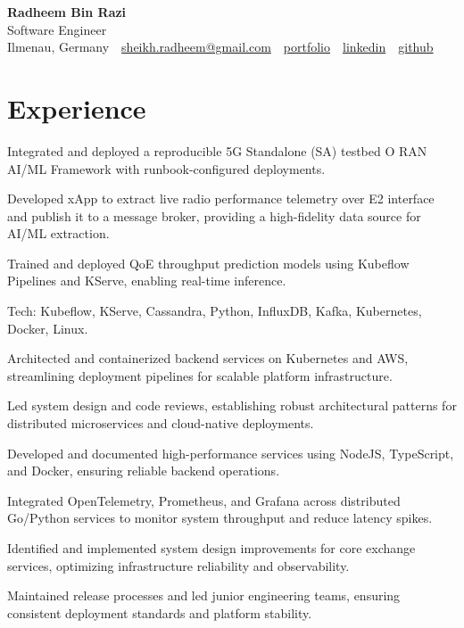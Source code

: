 \documentclass[10pt,a4paper]{resume}
\makeatletter
\newcommand{\Portfolio}{https://radheem.github.io/my-cv}
\newcommand{\PortfolioText}{portfolio}
\newcommand{\GitHub}{https://github.com/radheem}
\newcommand{\LinkedIn}{https://www.linkedin.com/in/radheem-razi}
\newcommand{\Email}{sheikh.radheem@gmail.com}
\makeatother
\begin{document}
\begin{center}
  {\huge\bfseries Radheem Bin Razi}\\[3pt]
  {\large Software Engineer}\\[6pt]
  \small
  Ilmenau, Germany \,\textbar\,
  \href{mailto:\Email}{\Email} \,\textbar\,
  \href{\Portfolio}{\PortfolioText} \,\textbar\,
  \href{\LinkedIn}{linkedin} \,\textbar\,
  \href{\GitHub}{github}
\end{center}
\vspace{2pt}

\section{Experience}

\bullets
  \item Integrated and deployed a reproducible 5G Standalone (SA) testbed O RAN AI/ML Framework with runbook-configured deployments.
  \item Developed xApp to extract live radio performance telemetry over E2 interface and publish it to a message broker, providing a high-fidelity data source for AI/ML extraction.
  \item Trained and deployed QoE throughput prediction models using Kubeflow Pipelines and KServe, enabling real-time inference.
  \item Tech: Kubeflow, KServe, Cassandra, Python, InfluxDB, Kafka, Kubernetes, Docker, Linux.
\bulletsend
\vspace{1.5pt}
\bullets
  \item Architected and containerized backend services on Kubernetes and AWS, streamlining deployment pipelines for scalable platform infrastructure.
  \item Led system design and code reviews, establishing robust architectural patterns for distributed microservices and cloud-native deployments.
  \item Developed and documented high-performance services using NodeJS, TypeScript, and Docker, ensuring reliable backend operations.
\bulletsend
\vspace{1.5pt}
\bullets
  \item Integrated OpenTelemetry, Prometheus, and Grafana across distributed Go/Python services to monitor system throughput and reduce latency spikes.
  \item Identified and implemented system design improvements for core exchange services, optimizing infrastructure reliability and observability.
  \item Maintained release processes and led junior engineering teams, ensuring consistent deployment standards and platform stability.
\bulletsend
\vspace{1.5pt}
\end{document}
